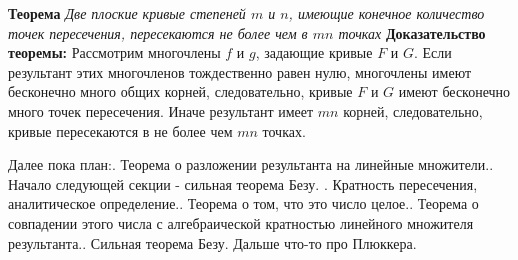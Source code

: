 \documentclass[a4paper, 12pt]{article}
\begin{document}
\bigskip
\textbf{Теорема}
\textit{Две плоские кривые степеней $m$ и $n$, имеющие конечное количество точек пересечения, пересекаются не более чем в $mn$ точках}\newline
\smallskip
\textbf{Доказательство теоремы:}
Рассмотрим многочлены $f$ и $g$, задающие кривые $F$ и $G$. Если результант этих многочленов тождественно равен нулю, многочлены имеют бесконечно много общих корней, следовательно, кривые $F$ и $G$ имеют бесконечно много точек пересечения. Иначе результант имеет $mn$ корней, следовательно, кривые пересекаются в не более чем $mn$ точках.

\bigskip
Далее пока план:. Теорема о разложении результанта на линейные множители.. Начало следующей секции - сильная теорема Безу. . Кратность пересечения, аналитическое определение.. Теорема о том, что это число целое.. Теорема о совпадении этого числа с алгебраической кратностью линейного множителя результанта.. Сильная теорема Безу. Дальше что-то про Плюккера.\newline
\end{document}
